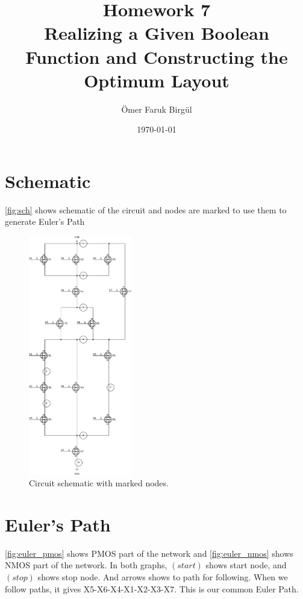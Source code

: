 \documentclass[a4paper,10pt]{article}
\author{Ömer Faruk Birgül}
\title{Homework 7 \\ \large Realizing a Given Boolean Function and Constructing the Optimum Layout}
\date{\today}
\begin{document}
\maketitle
\section{Schematic}
\autoref{fig:sch} shows schematic of the circuit and nodes are marked to use them to generate Euler's Path
\begin{figure}[ht!]
 \centering
 \includegraphics[width=0.4\textwidth]{output_nodes_small.pdf}

 \caption{Circuit schematic with marked nodes.}
  \label{fig:sch}
\end{figure}

\newpage
\section{Euler's Path}
\autoref{fig:euler_pmos} shows PMOS part of the network and \autoref{fig:euler_nmos} shows NMOS part of the network. In both graphs, $(start)$ shows start node, and $(stop)$ shows stop node. And arrows shows to path for following. When we follow paths, it gives X5-X6-X4-X1-X2-X3-X7. This is our common Euler Path.
\end{document}
